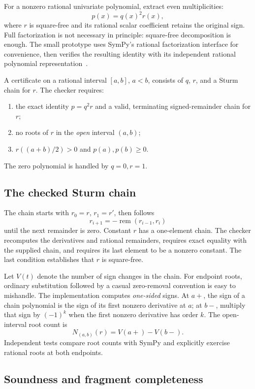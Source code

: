 For a nonzero rational univariate polynomial, extract even multiplicities:
\[
  p(x)=q(x)^2r(x),
\]
where $r$ is square-free and its rational scalar coefficient retains the original sign. Full factorization is not necessary in principle: square-free decomposition is enough. The small prototype uses SymPy's rational factorization interface for convenience, then verifies the resulting identity with its independent rational polynomial representation~\cite{sympy}.

A certificate on a rational interval $[a,b]$, $a<b$, consists of $q$, $r$, and a Sturm chain for $r$. The checker requires:
\begin{enumerate}
\item the exact identity $p=q^2r$ and a valid, terminating signed-remainder chain for $r$;
\item no roots of $r$ in the \emph{open} interval $(a,b)$;
\item $r((a+b)/2)>0$ and $p(a),p(b)\ge0$.
\end{enumerate}
The zero polynomial is handled by $q=0,r=1$.

\subsection{The checked Sturm chain}

The chain starts with $r_0=r$, $r_1=r'$, then follows
\[
 r_{i+1}=-\operatorname{rem}(r_{i-1},r_i)
\]
until the next remainder is zero. Constant $r$ has a one-element chain. The checker recomputes the derivatives and rational remainders, requires exact equality with the supplied chain, and requires its last element to be a nonzero constant. The last condition establishes that $r$ is square-free.

Let $V(t)$ denote the number of sign changes in the chain. For endpoint roots, ordinary substitution followed by a casual zero-removal convention is easy to mishandle. The implementation computes \emph{one-sided} signs. At $a+$, the sign of a chain polynomial is the sign of its first nonzero derivative at $a$; at $b-$, multiply that sign by $(-1)^k$ when the first nonzero derivative has order $k$. The open-interval root count is
\[
 N_{(a,b)}(r)=V(a+)-V(b-).
\]
Independent tests compare root counts with SymPy and explicitly exercise rational roots at both endpoints.

\subsection{Soundness and fragment completeness}


